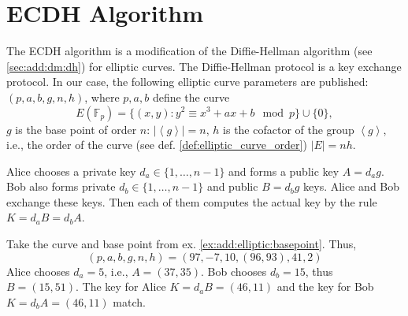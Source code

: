 \section{ECDH Algorithm}

The ECDH algorithm is a modification of the Diffie-Hellman algorithm (see \autoref{sec:add:dm:dh}) for elliptic curves. The Diffie-Hellman protocol is a key exchange protocol. In our case, the following elliptic curve parameters are published: $(p,a,b,g,n,h)$, where $p,a,b$ define the curve 
\[
E\left(\mathbb{F}_p\right) = \{(x,y): y^2 \equiv x^3 +a x + b \mod p
\} \cup \{0\},
\]
$g$ is the base point of order $n$: $\left|\left<g\right>\right| = n$, $h$ is the cofactor of the group $\left<g\right>$, i.e., the order of the curve (see def. \ref{def:elliptic_curve_order}) $\left|E\right| = nh$.

Alice chooses a private key $d_a \in \{1, \dots, n - 1\}$ and forms a public key $A = d_a g$. Bob also forms private $d_b \in \{1, \dots, n - 1\}$ and public $B = d_b g$ keys. Alice and Bob exchange these keys. Then each of them computes the actual key by the rule $K = d_a B = d_b A$. 

\begin{example}
\label{ex:add:discretmath:ecdh}
Take the curve and base point from ex. \ref{ex:add:elliptic:basepoint}. Thus, 
\[
(p,a,b,g,n,h) = (97, -7, 10, (96,93), 41, 2)
\]
Alice chooses $d_a = 5$, i.e., $A = (37, 35)$. Bob chooses $d_b = 15$, thus $B = (15,51)$. The key for Alice $K = d_a B = (46,11)$ and the key for Bob $K = d_b A = (46,11)$ match. 
\end{example}